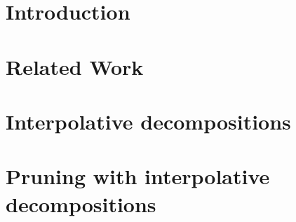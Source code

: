 \documentclass{article}
\begin{document}
\begin{abstract}
\end{abstract}



\section{Introduction}
\label{sec:intro}


\section{Related Work}
\label{sec:related}


\section{Interpolative decompositions}
\label{sec:ID}


\section{Pruning with interpolative decompositions}
\label{sec:pruneID}

\end{document}
